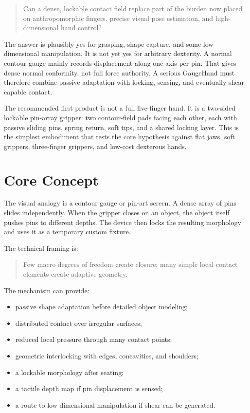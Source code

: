 \documentclass[11pt]{article}
\newcommand{\GaugeHand}{GaugeHand}
\begin{document}
\begin{quote}
Can a dense, lockable contact field replace part of the burden now placed on anthropomorphic fingers, precise visual pose estimation, and high-dimensional hand control?
\end{quote}

The answer is plausibly yes for grasping, shape capture, and some low-dimensional manipulation. It is not yet yes for arbitrary dexterity. A normal contour gauge mainly records displacement along one axis per pin. That gives dense normal conformity, not full force authority. A serious \GaugeHand{} must therefore combine passive adaptation with locking, sensing, and eventually shear-capable contact.

The recommended first product is not a full five-finger hand. It is a two-sided lockable pin-array gripper: two contour-field pads facing each other, each with passive sliding pins, spring return, soft tips, and a shared locking layer. This is the simplest embodiment that tests the core hypothesis against flat jaws, soft grippers, three-finger grippers, and low-cost dexterous hands.

\section{Core Concept}

The visual analogy is a contour gauge or pin-art screen. A dense array of pins slides independently. When the gripper closes on an object, the object itself pushes pins to different depths. The device then locks the resulting morphology and uses it as a temporary custom fixture.

The technical framing is:

\begin{quote}
Few macro degrees of freedom create closure; many simple local contact elements create adaptive geometry.
\end{quote}

The mechanism can provide:

\begin{itemize}
  \item passive shape adaptation before detailed object modeling;
  \item distributed contact over irregular surfaces;
  \item reduced local pressure through many contact points;
  \item geometric interlocking with edges, concavities, and shoulders;
  \item a lockable morphology after seating;
  \item a tactile depth map if pin displacement is sensed;
  \item a route to low-dimensional manipulation if shear can be generated.
\end{itemize}
\end{document}
